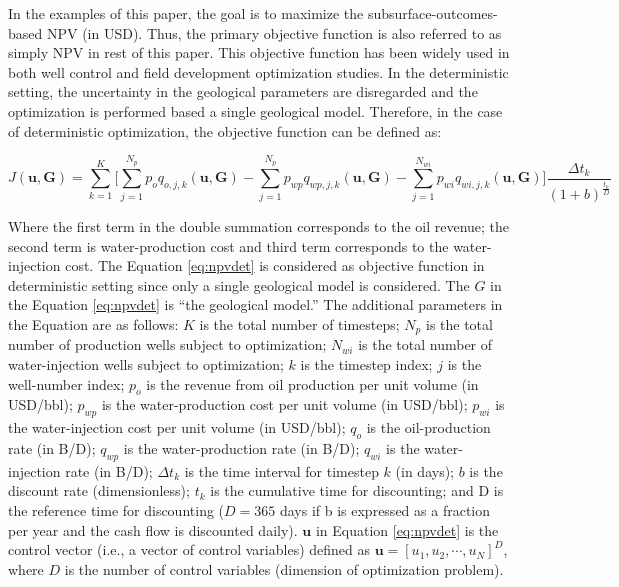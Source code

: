 \documentclass[]{elsarticle} %
\begin{document}
In the examples of this paper, the goal is to maximize the subsurface-outcomes-based NPV (in USD). Thus, the primary objective function is also referred to as simply NPV in rest of this paper. This objective function has been widely used in both well control and field development optimization studies. In the deterministic setting, the uncertainty in the geological parameters are disregarded and the optimization is performed based a single geological model. Therefore, in the case of deterministic optimization, the objective function can be defined as:

\begin{equation}
J(\mathbf{u, G})= \sum_{k=1}^{K} \Bigg [\sum_{j=1}^{N_p}p_oq_{o,j,k}(\mathbf{u, G}) 
- \sum_{j=1}^{N_p}p_{wp}q_{wp,j,k}(\mathbf{u, G}) - 
\sum_{j=1}^{N_{wi}}p_{wi}q_{wi,j,k}(\mathbf{u, G}) \Bigg]\frac{\Delta t_k}{(1+b)^{\frac{t_k}{D}}}
\label{eq:npvdet}
\end{equation}

Where the first term in the double summation corresponds to the oil revenue; the second term is water-production cost and third term corresponds to the water-injection cost. The Equation \eqref{eq:npvdet} is considered as objective function in deterministic setting since only a single geological model is considered. The \(G\) in the Equation \eqref{eq:npvdet} is ``the geological model.'' The additional parameters in the Equation are as follows: \(K\) is the total number of timesteps; \(N_p\) is the total number of production wells subject to optimization; \(N_{wi}\) is the total number of water-injection wells subject to optimization; \(k\) is the timestep index; \(j\) is the well-number index; \(p_o\) is the revenue from oil production per unit volume (in USD/bbl); \(p_{wp}\) is the water-production cost per unit volume (in USD/bbl); \(p_{wi}\) is the water-injection cost per unit volume (in USD/bbl); \(q_o\) is the oil-production rate (in B/D); \(q_{wp}\) is the water-production rate (in B/D); \(q_{wi}\) is the water-injection rate (in B/D); \(\Delta t_k\) is the time interval for timestep \(k\) (in days); \(b\) is the discount rate (dimensionless); \(t_k\) is the cumulative time for discounting; and D is the reference time for discounting (\(D = 365\) days if b is expressed as a fraction per year and the cash flow is discounted daily). \(\mathbf{u}\) in Equation \eqref{eq:npvdet} is the control vector (i.e., a vector of control variables) defined as \(\mathbf{u} = [u_1, u_2, \cdots, u_N]^D\), where \(D\) is the number of control variables (dimension of optimization problem).
\end{document}
